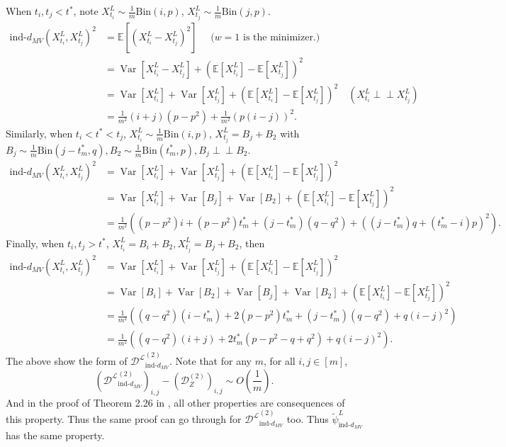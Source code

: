 \documentclass[12pt]{article}
\newcommand{\EE}{\mathbb{E}}
\theoremstyle{definition}
\newcommand{\Var}{\operatorname{Var}}
\newcommand{\ind}{\perp\!\!\!\!\perp}
\begin{document}
When $t_i,t_j < t^*$, note $X^L_{t_i} \sim \frac{1}{m} \text{Bin}(i,p)$, $X^L_{t_j} \sim \frac{1}{m} \text{Bin}(j,p)$. 
\begin{align*}
\text{ind-}d_{MV}(X^L_{t_i},X^L_{t_j})^2 & =  \EE[(X^L_{t_i}-X^L_{t_j})^2] \quad \text{ ($w=1$ is the minimizer.)}  \\
& =  \Var[X^L_{t_i}-X^L_{t_j}]   + \left(\EE[X^L_{t_i}]-\EE[X^L_{t_j}]\right)^2 \\
& = \Var[X^L_{t_i}]+\Var[X^L_{t_j}] + \left(\EE[X^L_{t_i}]-\EE[X^L_{t_j}]\right)^2  \quad (X^L_{t_i} \ind X^L_{t_j})\\
& = \frac{1}{m^2}  (i+j)(p-p^2) + \frac{1}{m^2}\left(p(i-j)\right)^2. 
\end{align*}
Similarly, when $t_i < t^* < t_j$, $X^L_{t_i} \sim \frac{1}{m} \text{Bin}(i,p)$, $X^L_{t_j} = B_j+B_2$ with $ B_j\sim \frac{1}{m}\text{Bin}(j - t_m^*,q), B_2 \sim \frac{1}{m}\text{Bin}(t_m^*,p), B_j \ind B_2$.
\begin{align*}
\text{ind-}d_{MV}(X^L_{t_i},X^L_{t_j})^2
& = \Var[X^L_{t_i}]+\Var[X^L_{t_j}] + \left(\EE[X^L_{t_i}]-\EE[X^L_{t_j}]\right)^2  \\
& = \Var[X^L_{t_i}]+\Var[B_j] + \Var[B_2]+ \left(\EE[X^L_{t_i}]-\EE[X^L_{t_j}]\right)^2  \\
& = \frac{1}{m^2}\left( \left(p-p^2\right)i + \left(p-p^2\right)t^*_m + (j-t^*_m)(q-q^2) + \left(\left( j-t^*_m   \right)q +\left(t^*_m - i \right)p\right)^2   \right).
\end{align*}
Finally, when $t_i, t_j > t^*$, $X^L_{t_i} = B_i + B_2, X^L_{t_j} = B_j + B_2$, then 
\begin{align*}
\text{ind-}d_{MV}(X^L_{t_i},X^L_{t_j})^2
& = \Var[X^L_{t_i}]+\Var[X^L_{t_j}] + \left(\EE[X^L_{t_i}]-\EE[X^L_{t_j}]\right)^2  \\
& = \Var[B_i]+\Var[B_2]+\Var[B_j] + \Var[B_2]+ \left(\EE[X^L_{t_i}]-\EE[X^L_{t_j}]\right)^2  \\
& = \frac{1}{m^2}\left( \left(q-q^2\right)(i-t^*_m) + 2\left(p-p^2\right)t^*_m + (j-t^*_m)(q-q^2) + q(i-j)^2  \right) \\
& = \frac{1}{m^2}\left(  (q-q^2)(i+j)+2t^*_m(p-p^2-q+q^2)   + q(i-j)^2  \right).
\end{align*}
The above show the form of $\mathcal{D^L}^{(2)}_{\text{ind-}d_{MV}}$. Note that for any $m$, for all $i,j\in[m]$,
$$
(\mathcal{D^L}^{(2)}_{\text{ind-}d_{MV}})_{i,j} - (\mathcal{D}^{(2)}_Z)_{i,j} \sim O\left(\frac{1}{m}\right).
$$
And in the proof of Theorem 2.26 in \cite{chen2024euclidean}, all other properties are consequences of this property. Thus the same proof can go through for $\mathcal{D^L}^{(2)}_{\text{ind-}d_{MV}}$ too. Thus $\tilde{\psi}^L_{\text{ind-}d_{MV}}$ has the same property. 
\end{document}
